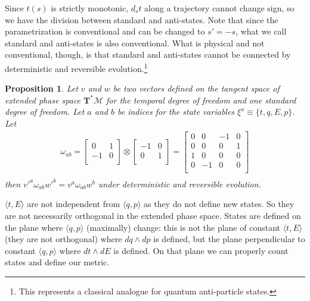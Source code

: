 \documentclass[aps,pra,10pt,twocolumn,floatfix,nofootinbib]{revtex4-1}
\newtheorem{prop}[thm]{Proposition}
\theoremstyle{definition}
\begin{document}
Since $t(s)$ is strictly monotonic, $d_{s}t$ along a trajectory cannot change sign, so we have the division between standard and anti-states. Note that since the parametrization is conventional and can be changed to $s'=-s$, what we call standard and anti-states is also conventional. What is physical and not conventional, though, is that standard and anti-states cannot be connected by deterministic and reversible evolution.\footnote{This represents a classical analogue for quantum anti-particle states.}

\begin{prop}\label{tdofInvariant}
Let $v$ and $w$ be two vectors defined on the tangent space of extended phase space $\mathbf{T}^*\mathcal{M}$ for the temporal degree of freedom and one standard degree of freedom. Let $a$ and $b$ be indices for the state variables $\xi^a\equiv\{t, q, E, p\}$. Let
\begin{align*}
\omega_{ab} =  \left[
  \begin{array}{cc}
    0 & 1 \\
    -1 & 0 \\
  \end{array}
\right] \otimes \left[
  \begin{array}{cc}
    -1 & 0 \\
    0 & 1 \\
  \end{array}
\right]
= \left[
  \begin{array}{cccc}
    0 & 0 & -1 & 0 \\
    0 & 0 & 0 & 1 \\
    1 & 0 & 0 & 0 \\
    0 & -1 & 0 & 0 \\
  \end{array}
\right] \\
\end{align*}
then $v'^{a} \omega_{ab} w'^{b}=v^{a} \omega_{ab} w^{b}$ under deterministic and reversible evolution.
\end{prop}

$\langle t, E \rangle$ are not independent from $\langle q, p \rangle$ as they do not define new states. So they are not necessarily orthogonal in the extended phase space. States are defined on the plane where $\langle q, p \rangle$ (maximally) change: this is not the plane of constant $\langle t, E \rangle$ (they are not orthogonal) where $dq \wedge dp$ is defined, but the plane perpendicular to constant $\langle q, p \rangle$ where $dt \wedge dE$ is defined. On that plane we can properly count states and define our metric.
\end{document}
